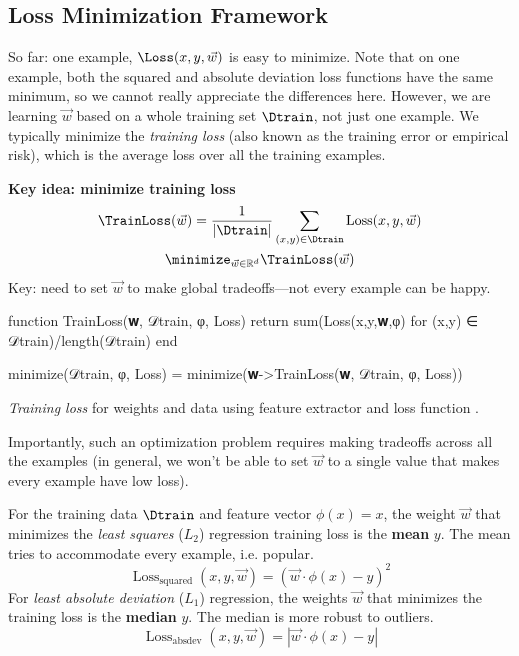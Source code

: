 
\subsection{Loss Minimization Framework} %
\label{sub:loss_minimization_framework}

So far: one example, $\Loss(x, y, \vec{w})$ is easy to minimize.
% 
Note that on one example, both the squared and absolute deviation loss functions have the same minimum,
so we cannot really appreciate the differences here.
However, we are learning $\vec{w}$ based on a whole training set $\Dtrain$,
not just one example.
We typically minimize the \textit{training loss} (also known as the training error or empirical risk), which is the average loss over all the training examples.
\begin{example} %
\textbf{Key idea: minimize training loss}
\begin{gather*}
    \TrainLoss(\vec{w}) = \frac{1}{|\Dtrain|} \sum_{(x,y) \in \Dtrain} \operatorname{Loss}(x,y,\vec{w})\\
    \minimize_{\vec{w} \in \mathbb{R}^d} \TrainLoss(\vec{w})
\end{gather*}
Key: need to set $\vec{w}$ to make global tradeoffs---not every example can be happy.
\end{example}
\begin{algorithm}
\begin{juliaverbatim}
function TrainLoss(𝐰, 𝒟train, φ, Loss)
    return sum(Loss(x,y,𝐰,φ) for (x,y) ∈ 𝒟train)/length(𝒟train)
end

minimize(𝒟train, φ, Loss) =
    minimize(𝐰->TrainLoss(𝐰, 𝒟train, φ, Loss))
\end{juliaverbatim}

\caption{
    \label{alg:trainloss} \textit{Training loss} for weights  and data  using feature extractor  and loss function .
}
\end{algorithm}

Importantly, such an optimization problem requires making tradeoffs across all the examples
(in general, we won't be able to set $\vec{w}$ to a single value that makes every example have low loss).


\begin{example}
    For the training data $\Dtrain$ and feature vector $\phi(x) = x$, the weight $\vec{w}$ that minimizes the \textit{least squares} ($L_2$) regression training loss is the \textbf{mean} $y$. The mean tries to accommodate every example, i.e. popular.
    \[
      \operatorname{Loss}_\text{squared}(x, y, \vec{w}) = (\vec{w} \cdot \phi(x) - y)^2
    \]
    For \textit{least absolute deviation} ($L_1$) regression, the weights $\vec{w}$ that minimizes the training loss is the \textbf{median} $y$. The median is more robust to outliers.
    \[
      \operatorname{Loss}_\text{absdev}(x, y, \vec{w}) = |\vec{w} \cdot \phi(x) - y|
    \]
\end{example}


